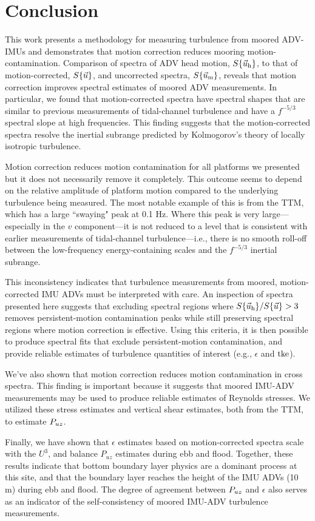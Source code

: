 
\section{Conclusion}
\label{sec:conclusion}
 
This work presents a methodology for measuring turbulence from moored ADV-IMUs and demonstrates that motion correction reduces mooring motion-contamination. Comparison of spectra of ADV head motion, $S\{\vec{u}_\mathrm{h}\}$, to that of motion-corrected, $S\{\vec{u}\}$, and uncorrected spectra, $S\{\vec{u}_\mathrm{m}\}$, reveals that motion correction improves spectral estimates of moored ADV measurements. In particular, we found that motion-corrected spectra have spectral shapes that are similar to previous measurements of tidal-channel turbulence and have a $f^{-5/3}$ spectral slope at high frequencies. This finding suggests that the motion-corrected spectra resolve the inertial subrange predicted by Kolmogorov's theory of locally isotropic turbulence.

Motion correction reduces motion contamination for all platforms we presented but it does not necessarily remove it completely. This outcome seems to depend on the relative amplitude of platform motion compared to the underlying turbulence being measured. The most notable example of this is from the TTM, which has a large ``swaying" peak at 0.1 Hz. Where this peak is very large---especially in the $v$ component---it is not reduced to a level that is consistent with earlier measurements of tidal-channel turbulence---i.e., there is no smooth roll-off between the low-frequency energy-containing scales and the $f^{-5/3}$ inertial subrange.

This inconsistency indicates that turbulence measurements from moored, motion-corrected IMU ADVs must be interpreted with care. An inspection of spectra presented here suggests that excluding spectral regions where $S\{\vec{u}_\mathrm{h}\} / S\{\vec{u}\} > 3$ removes persistent-motion contamination peaks while still preserving spectral regions where motion correction is effective. Using this criteria, it is then possible to produce spectral fits that exclude persistent-motion contamination, and provide reliable estimates of turbulence quantities of interest (e.g., $\epsilon$ and $\mathrm{tke}$).

We've also shown that motion correction reduces motion contamination in cross spectra. This finding is important because it suggests that moored IMU-ADV measurements may be used to produce reliable estimates of Reynolds stresses. We utilized these stress estimates and vertical shear estimates, both from the TTM, to estimate $P_{uz}$. 

Finally, we have shown that $\epsilon$ estimates based on motion-corrected spectra scale with the $U^3$, and balance $P_{uz}$ estimates during ebb and flood. Together, these results indicate that bottom boundary layer physics are a dominant process at this site, and that the boundary layer reaches the height of the IMU ADVs (10 m) during ebb and flood. The degree of agreement between $P_{uz}$ and $\epsilon$ also serves as an indicator of the self-consistency of moored IMU-ADV turbulence measurements. 

